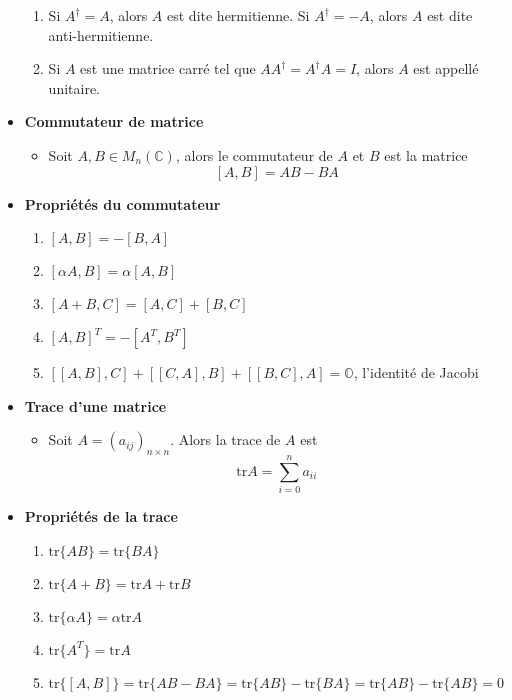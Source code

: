 \begin{itemize}
\begin{enumerate}
              \item Si $A^\dagger = A$, alors $A$ est dite hermitienne. Si $A^\dagger = -A$, alors $A$ est dite anti-hermitienne.
              \item Si $A$ est une matrice carré tel que $AA^\dagger = A^\dagger A = I$, alors $A$ est appellé unitaire.
          \end{enumerate}
    \item[] \textbf{Commutateur de matrice} \begin{itemize}
              \item[] Soit $A, B \in M_n(\mathbb{C})$, alors le commutateur de $A$ et $B$ est la matrice \begin{equation*}
                        \left[ A, B \right] = AB - BA
                    \end{equation*}
          \end{itemize}
    \item[] \textbf{Propriétés du commutateur} \begin{enumerate}
              \item $[A, B] = -[B, A]$
              \item $[\alpha A, B ] = \alpha [A, B] $
              \item $[A + B, C] = [A, C] + [B, C]$
              \item $[A, B]^T = -[A^T, B^T]$
              \item $[[A, B], C] + [[C, A], B] + [[B, C], A] = \mathbb{O}$, l'identité de Jacobi
          \end{enumerate}
    \item[] \textbf{Trace d'une matrice} \begin{itemize}
              \item[] Soit $A = (a_{ij})_{n \times n}$. Alors la trace de $A$ est \begin{equation*}
                        \text{tr} A =  \sum_{i = 0}^{n} a_{ii}
                    \end{equation*}
          \end{itemize}
    \item[] \textbf{Propriétés de la trace} \begin{enumerate}
              \item $\text{tr}\{ AB \} = \text{tr}\{ BA \}$
              \item $\text{tr}\{ A + B \} = \text{tr}A + \text{tr}B$
              \item $\text{tr}\{ \alpha A \} = \alpha \text{tr}A $
              \item $\text{tr}\{ A^T \} = \text{tr}A$
              \item $\text{tr}\{ [A, B] \} = \text{tr}\{ AB - BA \} = \text{tr}\{ AB \} - \text{tr}\{BA\} = \text{tr}\{ AB \} - \text{tr}\{AB\} = 0$
          \end{enumerate}
\end{itemize}

